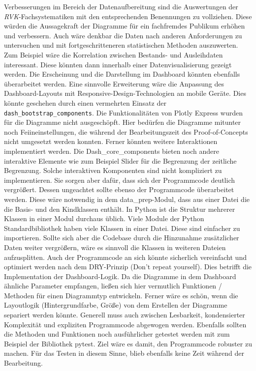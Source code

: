 Verbesserungen im Bereich der Datenaufbereitung sind die Auswertungen der \textit{\acrshort{RVK}}-Fachsystematiken mit den entsprechenden Benennungen
zu vollziehen. Diese würden die Aussagekraft der Diagramme für ein fachfremdes Publikum erhöhen und verbessern.
Auch wäre denkbar die Daten nach anderen Anforderungen zu untersuchen und mit fortgeschritteneren statistischen Methoden auszuwerten.
Zum Beispiel wäre die Korrelation zwischen Bestands- und Ausleihdaten interessant. Diese könnten dann innerhalb einer Datenvisualisierung gezeigt werden.  
Die Erscheinung und die Darstellung im Dashboard könnten ebenfalls überarbeitet werden. Eine sinnvolle Erweiterung wäre die Anpassung des Dashboard-Layouts
mit Responsive-Design-Technologien an mobile Geräte. Dies könnte geschehen durch einen vermehrten Einsatz der \texttt{dash\_bootstrap\_components}.
Die Funktionalitäten von Plotly Express wurden für die Diagramme nicht ausgeschöpft. Hier bedürfen die Diagramme mitunter noch Feiineinstellungen, die während der Bearbeitungszeit
des Proof-of-Concepts nicht umgesetzt werden konnten. Ferner könnten weitere Interaktionen implementiert werden. Die Dash\_core\_components bieten 
noch andere interaktive Elemente wie zum Beispiel Slider für die Begrenzung der zeitliche Begrenzung. 
Solche interaktiven Komponenten sind nicht kompliziert zu implementieren. Sie sorgen aber dafür, dass sich der Programmcode deutlich vergrößert.
Dessen ungeachtet sollte ebenso der Programmcode überarbeitet werden. Diese wäre notwendig in dem data\_prep-Modul, dass aus einer Datei die die
Basis- und den Kindklassen enthält. In Python ist die Struktur mehrerer Klassen in einer Modul durchaus üblich. Viele Module der Python Standardbibliothek
haben viele Klassen in einer Datei. Diese sind einfacher zu importieren. Sollte sich aber die Codebase durch die Hinzunahme zusätzlicher
Daten weiter vergrößern, wäre es sinnvoll die Klassen in weiteren Dateien aufzusplitten. Auch der Programmcode an sich
könnte sicherlich vereinfacht und optimiert werden nach dem DRY-Prinzip (Don't repeat yourself). Dies betrifft die Implementation der Dashboard-Logik. 
Da die Diagramme in dem Dashboard ähnliche Parameter empfangen, ließen sich hier vermutlich Funktionen / Methoden für einen Diagrammtyp entwickeln.
Ferner wäre es schön, wenn die Layoutlogik (Hintergrundfarbe, Größe) von dem Erstellen der Diagramme separiert werden könnte.
Generell muss auch zwischen Lesbarkeit, kondensierter Komplexität\cite[Vgl.][]{ousterhout_philosophy_2018} und expliziten Programmcode abgewogen werden. 
Ebenfalls sollten die Methoden und Funktionen noch ausführlicher getestet werden mit zum Beispiel der Bibliothek pytest. Ziel wäre es damit, den Programmcode
robuster zu machen. Für das Testen in diesem Sinne, blieb ebenfalls keine Zeit während der Bearbeitung. 

